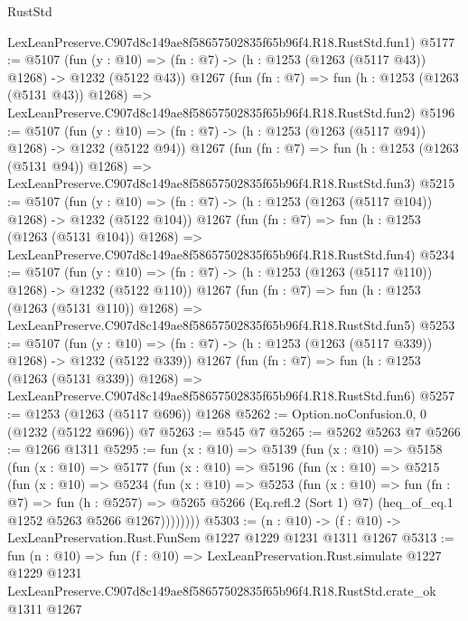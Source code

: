 \begin{lexlean}{RustStd}
\begin{coremodule}
    LexLeanPreserve.C907d8c149ae8f58657502835f65b96f4.R18.RustStd.fun1)
@5177 := @5107
    (fun (y : @10) => (fn : @7) -> (h : @1253 (@1263 (@5117 @43)) @1268) -> @1232 (@5122 @43))
    @1267
    (fun (fn : @7) =>
    fun (h : @1253 (@1263 (@5131 @43)) @1268) =>
    LexLeanPreserve.C907d8c149ae8f58657502835f65b96f4.R18.RustStd.fun2)
@5196 := @5107
    (fun (y : @10) => (fn : @7) -> (h : @1253 (@1263 (@5117 @94)) @1268) -> @1232 (@5122 @94))
    @1267
    (fun (fn : @7) =>
    fun (h : @1253 (@1263 (@5131 @94)) @1268) =>
    LexLeanPreserve.C907d8c149ae8f58657502835f65b96f4.R18.RustStd.fun3)
@5215 := @5107
    (fun (y : @10) => (fn : @7) -> (h : @1253 (@1263 (@5117 @104)) @1268) -> @1232 (@5122 @104))
    @1267
    (fun (fn : @7) =>
    fun (h : @1253 (@1263 (@5131 @104)) @1268) =>
    LexLeanPreserve.C907d8c149ae8f58657502835f65b96f4.R18.RustStd.fun4)
@5234 := @5107
    (fun (y : @10) => (fn : @7) -> (h : @1253 (@1263 (@5117 @110)) @1268) -> @1232 (@5122 @110))
    @1267
    (fun (fn : @7) =>
    fun (h : @1253 (@1263 (@5131 @110)) @1268) =>
    LexLeanPreserve.C907d8c149ae8f58657502835f65b96f4.R18.RustStd.fun5)
@5253 := @5107
    (fun (y : @10) => (fn : @7) -> (h : @1253 (@1263 (@5117 @339)) @1268) -> @1232 (@5122 @339))
    @1267
    (fun (fn : @7) =>
    fun (h : @1253 (@1263 (@5131 @339)) @1268) =>
    LexLeanPreserve.C907d8c149ae8f58657502835f65b96f4.R18.RustStd.fun6)
@5257 := @1253 (@1263 (@5117 @696)) @1268
@5262 := Option.noConfusion.{0, 0} (@1232 (@5122 @696)) @7
@5263 := @545 @7
@5265 := @5262 @5263 @7
@5266 := @1266 @1311
@5295 := fun (x : @10) =>
  @5139
    (fun (x : @10) =>
    @5158
      (fun (x : @10) =>
      @5177
        (fun (x : @10) =>
        @5196
          (fun (x : @10) =>
          @5215
            (fun (x : @10) =>
            @5234
              (fun (x : @10) =>
              @5253
                (fun (x : @10) =>
                fun (fn : @7) =>
                fun (h : @5257) =>
                @5265 @5266 (Eq.refl.{2} (Sort 1) @7) (heq_of_eq.{1} @1252 @5263 @5266 @1267))))))))
@5303 := (n : @10) -> (f : @10) -> LexLeanPreservation.Rust.FunSem @1227 @1229 @1231 @1311 @1267
@5313 := fun (n : @10) =>
  fun (f : @10) =>
  LexLeanPreservation.Rust.simulate
    @1227
    @1229
    @1231
    LexLeanPreserve.C907d8c149ae8f58657502835f65b96f4.R18.RustStd.crate_ok
    @1311
    @1267
\end{coremodule}
\end{lexlean}
